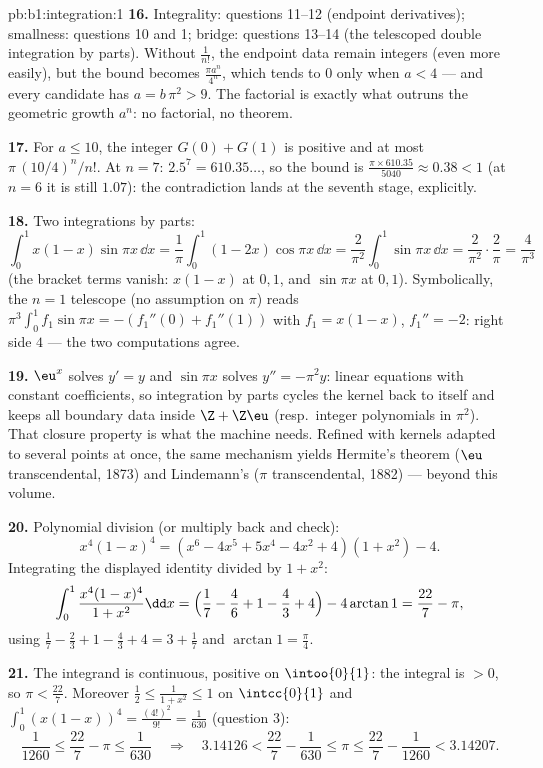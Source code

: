 \begin{solution}{pb:b1:integration:1}
\textbf{16.} Integrality: questions 11--12 (endpoint
derivatives); smallness: questions 10 and 1; bridge: questions
13--14 (the telescoped double integration by parts). Without
$\frac{1}{n!}$, the endpoint data remain integers (even more
easily), but the bound becomes $\frac{\pi a^n}{4^n}$, which
tends to $0$ only when $a < 4$ --- and every candidate has $a =
b\,\pi^2 > 9$. The factorial is exactly what outruns the
geometric growth $a^n$: no factorial, no theorem.

\textbf{17.} For $a \leq 10$, the integer $G(0) + G(1)$ is
positive and at most $\pi\,(10/4)^n/n!$. At $n = 7$:
$2.5^7 = 610.35\dots$, so the bound is $\frac{\pi \times
610.35}{5040} \approx 0.38 < 1$ (at $n = 6$ it is still
$1.07$): the contradiction lands at the seventh stage,
explicitly.

\textbf{18.} Two integrations by parts:
\[
\int_0^1 x(1-x)\sin\pi x\,\dd x
= \frac1\pi\int_0^1 (1 - 2x)\cos\pi x\,\dd x
= \frac{2}{\pi^2}\int_0^1 \sin\pi x\,\dd x
= \frac{2}{\pi^2}\cdot\frac{2}{\pi} = \frac{4}{\pi^3}
\]
(the bracket terms vanish: $x(1-x)$ at $0, 1$, and $\sin\pi x$
at $0, 1$). Symbolically, the $n = 1$ telescope (no assumption
on $\pi$) reads $\pi^3\int_0^1 f_1\sin\pi x = -(f_1''(0) +
f_1''(1))$ with $f_1 = x(1 - x)$, $f_1'' = -2$: right side $4$
--- the two computations agree.

\textbf{19.} $\eu^x$ solves $y' = y$ and $\sin\pi x$ solves
$y'' = -\pi^2 y$: linear equations with constant coefficients,
so integration by parts cycles the kernel back to itself and
keeps all boundary data inside $\Z + \Z\eu$ (resp.\ integer
polynomials in $\pi^2$). That closure property is what the
machine needs. Refined with kernels adapted to several points at
once, the same mechanism yields Hermite's theorem ($\eu$
transcendental, 1873) and Lindemann's ($\pi$ transcendental,
1882) --- beyond this volume.

\textbf{20.} Polynomial division (or multiply back and check):
\[
x^4(1-x)^4 = (x^6 - 4x^5 + 5x^4 - 4x^2 + 4)(1 + x^2) - 4 .
\]
Integrating the displayed identity divided by $1 + x^2$:
\[
\int_0^1 \frac{x^4(1-x)^4}{1+x^2}\dd x
= \Bigl(\frac17 - \frac46 + 1 - \frac43 + 4\Bigr)
- 4\arctan 1
= \frac{22}{7} - \pi ,
\]
using $\frac17 - \frac23 + 1 - \frac43 + 4 = 3 + \frac17$ and
$\arctan 1 = \frac\pi4$.

\textbf{21.} The integrand is continuous, positive on
$\intoo{0}{1}$: the integral is $> 0$, so $\pi < \frac{22}{7}$.
Moreover $\frac12 \leq \frac{1}{1+x^2} \leq 1$ on
$\intcc{0}{1}$ and $\int_0^1 (x(1-x))^4 = \frac{(4!)^2}{9!} =
\frac{1}{630}$ (question 3):
\[
\frac{1}{1260} \leq \frac{22}{7} - \pi \leq \frac{1}{630}
\quad\Longrightarrow\quad
3.14126 < \frac{22}{7} - \frac{1}{630} \leq \pi \leq
\frac{22}{7} - \frac{1}{1260} < 3.14207 .
\]


\end{solution}
